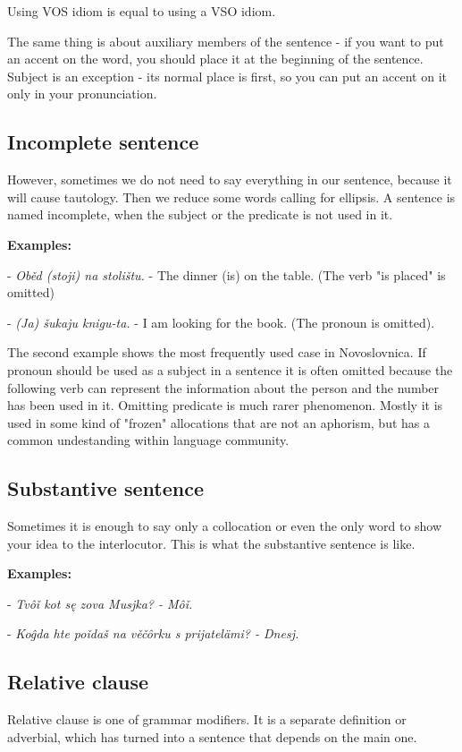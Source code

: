 Using VOS idiom is equal to using a VSO idiom.

The same thing is about auxiliary members of the sentence - if you want to put an accent on the word, you should place it at the beginning of the sentence. Subject is an exception - its normal place is first, so you can put an accent on it only in your pronunciation.

\subsection{Incomplete sentence}

However, sometimes we do not need to say everything in our sentence, because it will cause tautology. Then we reduce some words calling for ellipsis. A sentence is named incomplete, when the subject or the predicate is not used in it.

\textbf{Examples:}

- \textit{Oběd (stoji) na stolištu.} - The dinner (is) on the table. (The verb "is placed" is omitted)

- \textit{(Ja) šukaju knigu-ta.} - I am looking for the book. (The pronoun is omitted).

The second example shows the most frequently used case in Novoslovnica. If pronoun should be used as a subject in a sentence it is often omitted because the following verb can represent the information about the person and the number has been used in it. Omitting predicate is much rarer phenomenon. Mostly it is used in some kind of "frozen" allocations that are not an aphorism, but has a common undestanding within language community.

\subsection{Substantive sentence}

Sometimes it is enough to say only a collocation or even the only word to show your idea to the interlocutor. This is what the substantive sentence is like.

\textbf{Examples:}

- \textit{Tvôǐ kot sę zova Musjka? - Môǐ.}

- \textit{Koĝda hte poǐdaš na věčôrku s prijatelämi? - Dnesj.}

\subsection{Relative clause}

Relative clause is one of grammar modifiers. It is a separate definition or adverbial, which has turned into a sentence that depends on the main one.
